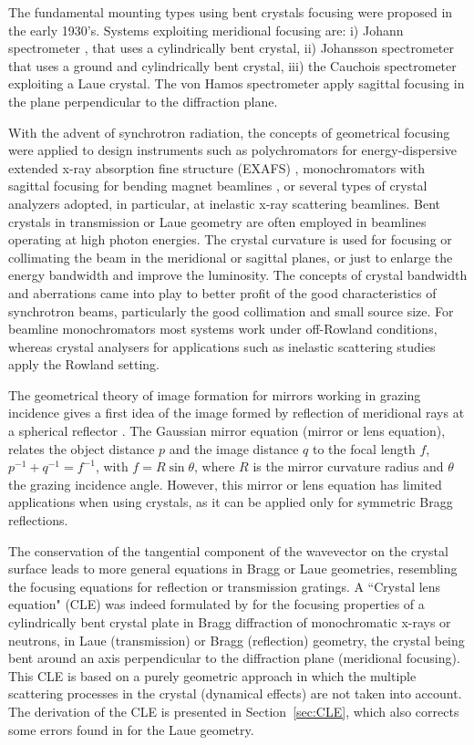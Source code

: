 \documentclass[preprint]{iucr}              %
\begin{document}
The fundamental mounting types using bent crystals focusing were proposed in the early 1930’s. Systems exploiting meridional focusing are: i) Johann spectrometer \cite{Johann1931}, that uses a cylindrically bent crystal,  ii) Johansson spectrometer \cite{Johansson1933} that uses a ground and cylindrically bent crystal, iii) the Cauchois spectrometer \cite{cauchois1933} exploiting a Laue crystal. The von Hamos spectrometer \cite{V.Hamos1933} apply sagittal focusing in the plane perpendicular to the diffraction plane.

With the advent of synchrotron radiation, the concepts of geometrical focusing were applied to design instruments such as polychromators for energy-dispersive extended x-ray absorption fine structure (EXAFS) \cite{Tolentino:ms0206}, monochromators with sagittal focusing for bending magnet beamlines \cite{Sparks1980}, or several types of crystal analyzers adopted, in particular, at inelastic x-ray scattering beamlines. Bent crystals in transmission or Laue geometry are often employed in beamlines operating at high photon energies. The crystal curvature is used for focusing or collimating the beam in the meridional \cite{Suortti1988} or sagittal \cite{Zhong2001} planes, or just to enlarge the energy bandwidth and improve the luminosity. The concepts of crystal bandwidth and aberrations came into play to better profit of the good characteristics of synchrotron beams, particularly the good collimation and small source size. For beamline monochromators  most systems work under off-Rowland conditions, whereas crystal analysers for applications such as inelastic scattering studies apply the Rowland setting.

The geometrical theory of image formation for mirrors working in grazing incidence gives a first idea of the image formed by reflection of meridional rays at a spherical reflector \cite{KB1948}. The Gaussian mirror equation (mirror or lens equation), relates the object distance $p$ and the image distance $q$ to the focal length $f$, $p^{-1}+q^{-1}=f^{-1}$, with $f=R \sin\theta$, where $R$ is the mirror curvature radius and $\theta$ the grazing incidence angle. However, this mirror or lens equation has limited applications when using crystals, as it can be applied only for symmetric Bragg reflections.

The conservation of the tangential component of the wavevector on the crystal surface leads to more general equations in Bragg or Laue geometries, resembling the focusing equations for reflection or transmission gratings.
A ``Crystal lens equation" (CLE) was indeed formulated by \cite{CK} for the focusing properties of a cylindrically bent crystal plate in Bragg diffraction of monochromatic x-rays or neutrons, in Laue (transmission) or Bragg (reflection) geometry, the crystal being bent around an axis perpendicular to the diffraction plane (meridional focusing). This CLE is based on a purely geometric approach in which the multiple scattering processes in the crystal (dynamical effects) are not taken into account. 
The derivation of the CLE is presented in Section~\ref{sec:CLE}, which also corrects
some errors found in \cite{CK} for the Laue geometry.
\end{document}
